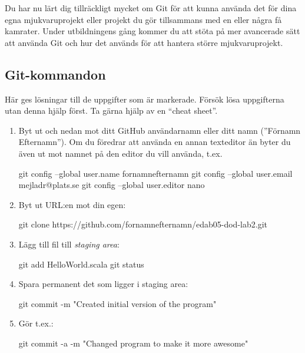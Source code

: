 Du har nu lärt dig tillräckligt mycket om Git för att kunna använda det för dina egna mjukvaruprojekt eller projekt du gör tillsammans med en eller några få kamrater. Under utbildningens gång kommer du att stöta på mer avancerade sätt att använda Git och hur det används för att hantera större mjukvaruprojekt.




\newpage

\subsection{Git-kommandon}\label{git:losningar}
Här ges lösningar till de uppgifter som är markerade. Försök lösa uppgifterna utan denna hjälp först. Ta gärna hjälp av en \enquote{cheat sheet}.

\begin{enumerate}[label=C\arabic*]
\item\label{git-config} Byt ut  och  nedan mot ditt GitHub användarnamn eller ditt namn (''Förnamn Efternamn''). Om du föredrar att använda en annan texteditor än  byter du även ut  mot namnet på den editor du vill använda, t.ex. 
\begin{Code}
git config --global user.name fornamnefternamn
git config --global user.email mejladr@plats.se
git config --global user.editor nano
\end{Code}

\item\label{git-clone} Byt ut URL:en mot din egen:
\begin{Code}
git clone https://github.com/fornamnefternamn/edab05-dod-lab2.git
\end{Code}

\item\label{git-add} Lägg till fil till \emph{staging area}:
\begin{Code}
git add HelloWorld.scala
git status
\end{Code}

\item\label{git-commit} Spara permanent det som ligger i staging area:
\begin{Code}
git commit -m "Created initial version of the program"
\end{Code}

\item\label{git-commit-a} Gör t.ex.:
\begin{Code}
git commit -a -m "Changed program to make it more awesome"
\end{Code}


\end{enumerate}
